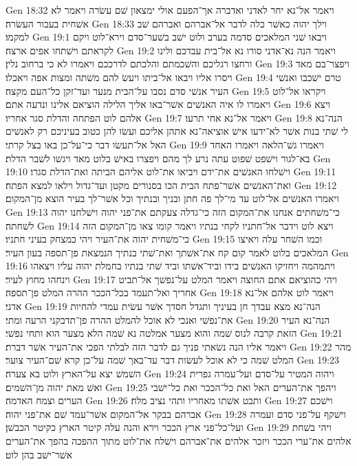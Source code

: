 Gen 18:32  ויאמר אל־נא יחר לאדני ואדברה אך־הפעם אולי ימצאון שׁם עשׂרה ויאמר לא אשׁחית בעבור העשׂרה׃
Gen 18:33  וילך יהוה כאשׁר כלה לדבר אל־אברהם ואברהם שׁב למקמו׃
Gen 19:1  ויבאו שׁני המלאכים סדמה בערב ולוט ישׁב בשׁער־סדם וירא־לוט ויקם לקראתם וישׁתחו אפים ארצה׃
Gen 19:2  ויאמר הנה נא־אדני סורו נא אל־בית עבדכם ולינו ורחצו רגליכם והשׁכמתם והלכתם לדרככם ויאמרו לא כי ברחוב נלין׃
Gen 19:3  ויפצר־בם מאד ויסרו אליו ויבאו אל־ביתו ויעשׂ להם משׁתה ומצות אפה ויאכלו׃
Gen 19:4  טרם ישׁכבו ואנשׁי העיר אנשׁי סדם נסבו על־הבית מנער ועד־זקן כל־העם מקצה׃
Gen 19:5  ויקראו אל־לוט ויאמרו לו איה האנשׁים אשׁר־באו אליך הלילה הוציאם אלינו ונדעה אתם׃
Gen 19:6  ויצא אלהם לוט הפתחה והדלת סגר אחריו׃
Gen 19:7  ויאמר אל־נא אחי תרעו׃
Gen 19:8  הנה־נא לי שׁתי בנות אשׁר לא־ידעו אישׁ אוציאה־נא אתהן אליכם ועשׂו להן כטוב בעיניכם רק לאנשׁים האל אל־תעשׂו דבר כי־על־כן באו בצל קרתי׃
Gen 19:9  ויאמרו גשׁ־הלאה ויאמרו האחד בא־לגור וישׁפט שׁפוט עתה נרע לך מהם ויפצרו באישׁ בלוט מאד ויגשׁו לשׁבר הדלת׃
Gen 19:10  וישׁלחו האנשׁים את־ידם ויביאו את־לוט אליהם הביתה ואת־הדלת סגרו׃
Gen 19:11  ואת־האנשׁים אשׁר־פתח הבית הכו בסנורים מקטן ועד־גדול וילאו למצא הפתח׃
Gen 19:12  ויאמרו האנשׁים אל־לוט עד מי־לך פה חתן ובניך ובנתיך וכל אשׁר־לך בעיר הוצא מן־המקום׃
Gen 19:13  כי־משׁחתים אנחנו את־המקום הזה כי־גדלה צעקתם את־פני יהוה וישׁלחנו יהוה לשׁחתה׃
Gen 19:14  ויצא לוט וידבר אל־חתניו לקחי בנתיו ויאמר קומו צאו מן־המקום הזה כי־משׁחית יהוה את־העיר ויהי כמצחק בעיני חתניו׃
Gen 19:15  וכמו השׁחר עלה ויאיצו המלאכים בלוט לאמר קום קח את־אשׁתך ואת־שׁתי בנתיך הנמצאת פן־תספה בעון העיר׃
Gen 19:16  ויתמהמה ויחזיקו האנשׁים בידו וביד־אשׁתו וביד שׁתי בנתיו בחמלת יהוה עליו ויצאהו וינחהו מחוץ לעיר׃
Gen 19:17  ויהי כהוציאם אתם החוצה ויאמר המלט על־נפשׁך אל־תביט אחריך ואל־תעמד בכל־הככר ההרה המלט פן־תספה׃
Gen 19:18  ויאמר לוט אלהם אל־נא אדני׃
Gen 19:19  הנה־נא מצא עבדך חן בעיניך ותגדל חסדך אשׁר עשׂית עמדי להחיות את־נפשׁי ואנכי לא אוכל להמלט ההרה פן־תדבקני הרעה ומתי׃
Gen 19:20  הנה־נא העיר הזאת קרבה לנוס שׁמה והוא מצער אמלטה נא שׁמה הלא מצער הוא ותחי נפשׁי׃
Gen 19:21  ויאמר אליו הנה נשׂאתי פניך גם לדבר הזה לבלתי הפכי את־העיר אשׁר דברת׃
Gen 19:22  מהר המלט שׁמה כי לא אוכל לעשׂות דבר עד־באך שׁמה על־כן קרא שׁם־העיר צוער׃
Gen 19:23  השׁמשׁ יצא על־הארץ ולוט בא צערה׃
Gen 19:24  ויהוה המטיר על־סדם ועל־עמרה גפרית ואשׁ מאת יהוה מן־השׁמים׃
Gen 19:25  ויהפך את־הערים האל ואת כל־הככר ואת כל־ישׁבי הערים וצמח האדמה׃
Gen 19:26  ותבט אשׁתו מאחריו ותהי נציב מלח׃
Gen 19:27  וישׁכם אברהם בבקר אל־המקום אשׁר־עמד שׁם את־פני יהוה׃
Gen 19:28  וישׁקף על־פני סדם ועמרה ועל־כל־פני ארץ הככר וירא והנה עלה קיטר הארץ כקיטר הכבשׁן׃
Gen 19:29  ויהי בשׁחת אלהים את־ערי הככר ויזכר אלהים את־אברהם וישׁלח את־לוט מתוך ההפכה בהפך את־הערים אשׁר־ישׁב בהן לוט׃
